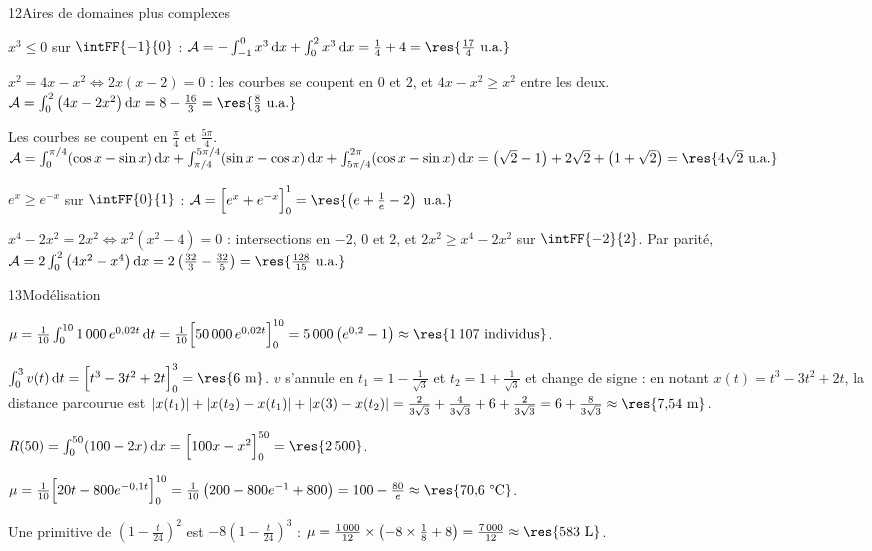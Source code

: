 \begin{corrige}{12}{Aires de domaines plus complexes}
\begin{questions}
  \item $x^{3}\leq0$ sur $\intFF{-1}{0}$ : $\mathcal{A}=-\int_{-1}^0x^{3}\,\mathrm{d}x+\int_0^2x^{3}\,\mathrm{d}x=\frac14+4=\res{\frac{17}{4}\text{ u.a.}}$
  \item $x^{2}=4x-x^{2}\iff2x(x-2)=0$ : les courbes se coupent en $0$ et $2$, et $4x-x^{2}\geq x^{2}$ entre les deux.
    $\mathcal{A}=\int_0^2\left(4x-2x^{2}\right)\mathrm{d}x=8-\frac{16}{3}=\res{\frac83\text{ u.a.}}$
  \item Les courbes se coupent en $\frac{\pi}{4}$ et $\frac{5\pi}{4}$. $\mathcal{A}=\int_0^{\pi/4}(\cos x-\sin x)\,\mathrm{d}x+\int_{\pi/4}^{5\pi/4}(\sin x-\cos x)\,\mathrm{d}x
    +\int_{5\pi/4}^{2\pi}(\cos x-\sin x)\,\mathrm{d}x=\left(\sqrt2-1\right)+2\sqrt2+\left(1+\sqrt2\right)=\res{4\sqrt2\text{ u.a.}}$
  \item $e^{x}\geq e^{-x}$ sur $\intFF{0}{1}$ : $\mathcal{A}=\Big[e^{x}+e^{-x}\Big]_0^1=\res{\left(e+\frac1e-2\right)\text{ u.a.}}$
  \item $x^{4}-2x^{2}=2x^{2}\iff x^{2}\left(x^{2}-4\right)=0$ : intersections en $-2$, $0$ et $2$, et $2x^{2}\geq x^{4}-2x^{2}$ sur $\intFF{-2}{2}$.
    Par parité, $\mathcal{A}=2\int_0^2\left(4x^{2}-x^{4}\right)\mathrm{d}x=2\left(\frac{32}{3}-\frac{32}{5}\right)=\res{\frac{128}{15}\text{ u.a.}}$
\end{questions}
\end{corrige}

\begin{corrige}{13}{Modélisation}
\begin{questions}
  \item $\mu=\frac{1}{10}\int_0^{10}1\,000\,e^{0{,}02t}\,\mathrm{d}t=\frac{1}{10}\Big[50\,000\,e^{0{,}02t}\Big]_0^{10}=5\,000\left(e^{0{,}2}-1\right)\approx\res{1\,107\text{ individus}}$.
  \item $\int_0^3v(t)\,\mathrm{d}t=\Big[t^{3}-3t^{2}+2t\Big]_0^3=\res{6\text{ m}}$. $v$ s'annule en $t_1=1-\frac{1}{\sqrt3}$ et $t_2=1+\frac{1}{\sqrt3}$ et
    change de signe : en notant $x(t)=t^{3}-3t^{2}+2t$, la distance parcourue est $|x(t_1)|+|x(t_2)-x(t_1)|+|x(3)-x(t_2)|
    =\frac{2}{3\sqrt3}+\frac{4}{3\sqrt3}+6+\frac{2}{3\sqrt3}=6+\frac{8}{3\sqrt3}\approx\res{7{,}54\text{ m}}$.
  \item $R(50)=\int_0^{50}(100-2x)\,\mathrm{d}x=\Big[100x-x^{2}\Big]_0^{50}=\res{2\,500}$.
  \item $\mu=\frac{1}{10}\Big[20t-800e^{-0{,}1t}\Big]_0^{10}=\frac{1}{10}\left(200-800e^{-1}+800\right)=100-\frac{80}{e}\approx\res{70{,}6\text{ °C}}$.
  \item Une primitive de $\left(1-\frac{t}{24}\right)^{2}$ est $-8\left(1-\frac{t}{24}\right)^{3}$ : $\mu=\frac{1\,000}{12}\times\left(-8\times\frac18+8\right)=\frac{7\,000}{12}\approx\res{583\text{ L}}$.
\end{questions}
\end{corrige}

